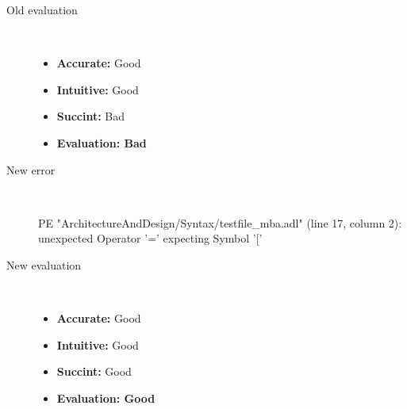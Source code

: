 \begin{description}
\begin{haskell}
\end{haskell}
  \item[Old evaluation]~\\
    \begin{itemize}
    \item \textbf{Accurate:} Good
    \item \textbf{Intuitive:} Good
    \item \textbf{Succint:} Bad
    \item \textbf{Evaluation: Bad}
    \end{itemize}
  \item[New error]~\\
\begin{haskell}
PE "ArchitectureAndDesign/Syntax/testfile_mba.adl" (line 17, column 2):
unexpected Operator '='
expecting Symbol '['\end{haskell}
  \item[New evaluation]~\\
    \begin{itemize}
    \item \textbf{Accurate:} Good
    \item \textbf{Intuitive:} Good
    \item \textbf{Succint:} Good
    \item \textbf{Evaluation: Good
}
    \end{itemize}
  \end{description}

\hrulefill

